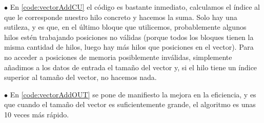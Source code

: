 $\bullet$ En \ref{code:vectorAddCU} el código es bastante inmediato, calculamos el índice al que le corresponde nuestro hilo concreto y hacemos la suma. Solo hay una sutileza, y es que, en el último bloque que utilicemos, probablemente algunos hilos estén trabajando posiciones no válidas (porque todos los bloques tienen la misma cantidad de hilos, luego hay más hilos que posiciones en el vector). Para no acceder a posiciones de memoria posiblemente inválidas, simplemente añadimos a los datos de entrada el tamaño del vector y, si el hilo tiene un índice superior al tamaño del vector, no hacemos nada.

$\bullet$ En \ref{code:vectorAddOUT} se pone de manifiesto la mejora en la eficiencia, y es que cuando el tamaño del vector es suficientemente grande, el algoritmo es unas 10 veces más rápido. 




